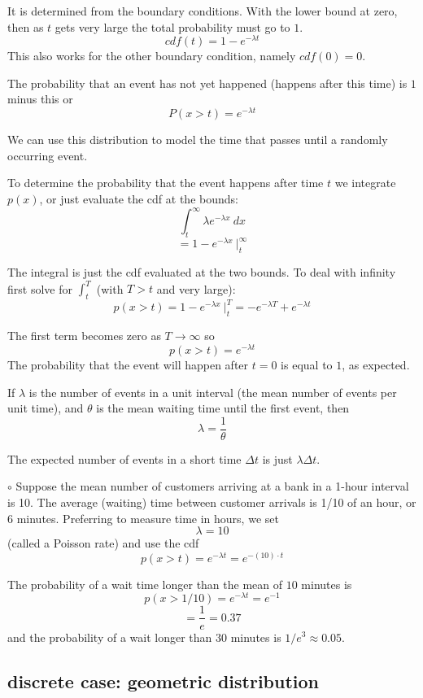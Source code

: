 \documentclass[11pt, oneside]{article}
\begin{document}
It is determined from the boundary conditions.  With the lower bound at zero, then as $t$ gets very large the total probability must go to $1$.
\[ cdf(t) = 1 - e^{-\lambda t} \]
This also works for the other boundary condition, namely $cdf(0) = 0$.

The probability that an event has not yet happened (happens after this time) is $1$ minus this or
\[ P(x > t) = e^{-\lambda t}  \]

We can use this distribution to model the time that passes until a randomly occurring event.

To determine the probability that the event happens after time $t$ we integrate $p(x)$, or just evaluate the cdf at the bounds:
\[ \int_t^{\infty} \lambda e^{-\lambda x} \ dx \]
\[ = 1 - e^{-\lambda x}  \ \bigg |_t^{\infty} \]

The integral is just the cdf evaluated at the two bounds.  To deal with infinity first solve for $\int_t^T $ (with $T > t$ and very large):
\[ p(x > t) = 1 - e^{-\lambda x} \ \bigg |_t^T = -  e^{-\lambda T} +  e^{-\lambda t} \]

The first term becomes zero as $T \rightarrow \infty$ so
\[ p(x > t) = e^{-\lambda t} \]
The probability that the event will happen after $t = 0$ is equal to $1$, as expected.

If $\lambda$ is the number of events in a unit interval (the mean number of events per unit time), and $\theta$ is the mean waiting time until the first event, then
\[ \lambda = \frac{1}{\theta} \]

The expected number of events in a short time $\Delta t$ is just $\lambda \Delta t$.

$\circ$ Suppose the mean number of customers arriving at a bank in a 1-hour interval is 10. The average (waiting) time between customer arrivals is 1/10 of an hour, or 6 minutes.  Preferring to measure time in hours, we set
\[ \lambda = 10 \]
(called a Poisson rate) and use the cdf
\[ p(x > t) = e^{-\lambda t} = e^{- (10) \cdot t} \]

The probability of a wait time longer than the mean of $10$ minutes is
\[ p(x > 1/10) = e^{-\lambda t} = e^{-1} \] 
\[ = \frac{1}{e} = 0.37 \]
and the probability of a wait longer than $30$ minutes is $1/e^3 \approx 0.05$.

\subsection*{discrete case:  geometric distribution}
\end{document}
